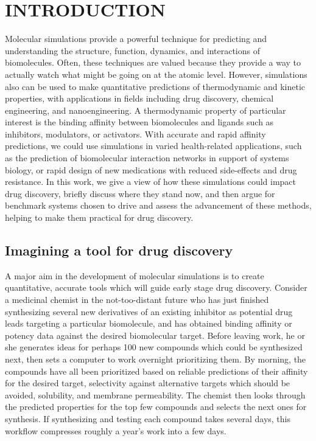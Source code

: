 \documentclass[aps,pre,twocolumn,nofootinbib,superscriptaddress,10pt, final,tightenlines]{revtex4-1}
\begin{document}
\maketitle


\section{INTRODUCTION}

Molecular simulations provide a powerful technique for predicting and understanding the structure, function, dynamics, and interactions of biomolecules. 
Often, these techniques are valued because they provide a way to actually watch what might be going on at the atomic level. 
However, simulations also can be used to make quantitative predictions of thermodynamic and kinetic properties, with applications in fields including drug discovery, chemical engineering, and nanoengineering. 
A thermodynamic property of particular interest is the binding affinity between biomolecules and ligands such as inhibitors, modulators, or activators. 
With accurate and rapid affinity predictions, we could use simulations in varied health-related applications, such as the prediction of biomolecular interaction networks in support of systems biology, or rapid design of new medications with reduced side-effects and drug resistance.
In this work, we give a view of how these simulations could impact drug discovery, briefly discuss where they stand now, and then argue for benchmark systems chosen to drive and assess the advancement of these methods, helping to make them practical for drug discovery.

\subsection{Imagining a tool for drug discovery}
A major aim in the development of molecular simulations is to create quantitative, accurate tools which will guide early stage drug discovery. 
Consider a medicinal chemist in the not-too-distant future who has just finished synthesizing several new derivatives of an existing inhibitor as potential drug leads targeting a particular biomolecule, and has obtained binding affinity or potency data against the desired biomolecular target. 
Before leaving work, he or she generates ideas for perhaps 100 new compounds which could be synthesized next, then sets a computer to work overnight prioritizing them. 
By morning, the compounds have all been prioritized based on reliable predictions of their affinity for the desired target, selectivity against alternative targets which should be avoided, solubility, and membrane permeability.  
The chemist then looks through the predicted properties for the top few compounds and selects the next ones for synthesis. 
If synthesizing and testing each compound takes several days, this workflow compresses roughly a year's work into a few days.
\end{document}
